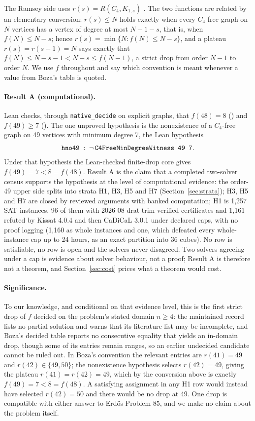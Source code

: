 \documentclass{anvil-paper}
\theoremstyle{definition}
\begin{document}
The Ramsey side uses $r(s)=R(C_4,K_{1,s})$ \citep{boza2024ramsey,zhang2017polarity}. The two functions are related by an elementary conversion: $r(s)\le N$ holds exactly when every $C_4$-free graph on $N$ vertices has a vertex of degree at most $N-1-s$, that is, when $f(N)\le N-s$; hence $r(s)=\min\{N: f(N)\le N-s\}$, and a plateau $r(s)=r(s+1)=N$ says exactly that $f(N)\le N-s-1<N-s\le f(N-1)$, a strict drop from order $N-1$ to order $N$. We use $f$ throughout and say which convention is meant whenever a value from Boza's table is quoted.

\paragraph{Result A (computational).} Lean checks, through \texttt{native\_decide} on explicit graphs, that $f(48)=8$ () and $f(49)\ge 7$ (). The one unproved hypothesis is the nonexistence of a $C_4$-free graph on 49 vertices with minimum degree 7, the Lean hypothesis
\[
\text{\texttt{hno49}} \;:\; \neg\,\text{\texttt{C4FreeMinDegreeWitness 49 7}} .
\]
Under that hypothesis the Lean-checked finite-drop core gives $f(49)=7<8=f(48)$. Result A is the claim that a completed two-solver census supports the hypothesis at the level of computational evidence: the order-49 upper side splits into strata H1, H3, H5 and H7 (Section~\ref{sec:strata}); H3, H5 and H7 are closed by reviewed arguments with banked computation; H1 is 1,257 SAT instances, 96 of them with 2026-08 drat-trim-verified certificates and 1,161 refuted by Kissat 4.0.4 and then CaDiCaL 3.0.1 under declared caps, with no proof logging (1,160 as whole instances and one, which defeated every whole-instance cap up to 24 hours, as an exact partition into 36 cubes). No row is satisfiable, no row is open and the solvers never disagreed. Two solvers agreeing under a cap is evidence about solver behaviour, not a proof; Result A is therefore not a theorem, and Section~\ref{sec:cost} prices what a theorem would cost.

\paragraph{Significance.} To our knowledge, and conditional on that evidence level, this is the first strict drop of $f$ decided on the problem's stated domain $n\ge 4$: the maintained record \citep{bloom-erdos85} lists no partial solution and warns that its literature list may be incomplete, and Boza's decided table \citep{boza2024ramsey} reports no consecutive equality that yields an in-domain drop, though some of its entries remain ranges, so an earlier undecided candidate cannot be ruled out. In Boza's convention the relevant entries are $r(41)=49$ and $r(42)\in\{49,50\}$; the nonexistence hypothesis selects $r(42)=49$, giving the plateau $r(41)=r(42)=49$, which by the conversion above is exactly $f(49)=7<8=f(48)$. A satisfying assignment in any H1 row would instead have selected $r(42)=50$ and there would be no drop at 49. One drop is compatible with either answer to Erdős Problem 85, and we make no claim about the problem itself.
\end{document}
